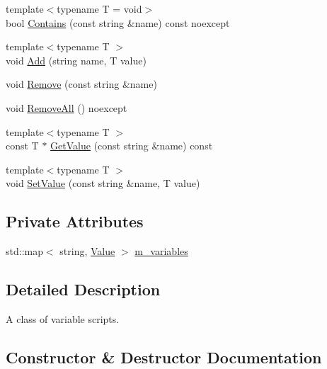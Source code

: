 \begin{DoxyCompactItemize}
\item 
{\footnotesize template$<$typename T  = void$>$ }\\bool \hyperlink{classmage_1_1_variable_script_a86143720f1495e20d461e0a65e2c5c8d}{Contains} (const string \&name) const noexcept
\item 
{\footnotesize template$<$typename T $>$ }\\void \hyperlink{classmage_1_1_variable_script_ad41e19065e7935974585a1b120ef47d4}{Add} (string name, T value)
\item 
void \hyperlink{classmage_1_1_variable_script_aac74a9edbe78e0caa1095ce32835501d}{Remove} (const string \&name)
\item 
void \hyperlink{classmage_1_1_variable_script_add51955d83e85e6d6acd82cfe40bed26}{Remove\+All} () noexcept
\item 
{\footnotesize template$<$typename T $>$ }\\const T $\ast$ \hyperlink{classmage_1_1_variable_script_aaed50c03f7affeeac269fbc15248caf6}{Get\+Value} (const string \&name) const
\item 
{\footnotesize template$<$typename T $>$ }\\void \hyperlink{classmage_1_1_variable_script_a43772c8d83466b32a6f16e5564d43026}{Set\+Value} (const string \&name, T value)
\end{DoxyCompactItemize}
\subsection*{Private Attributes}
\begin{DoxyCompactItemize}
\item 
std\+::map$<$ string, \hyperlink{namespacemage_aa1fe0628487e0706e44efdc62dbdb3a2}{Value} $>$ \hyperlink{classmage_1_1_variable_script_aed925cedf17c486fad876764e53d9e04}{m\+\_\+variables}
\end{DoxyCompactItemize}


\subsection{Detailed Description}
A class of variable scripts. 

\subsection{Constructor \& Destructor Documentation}
\hypertarget{classmage_1_1_variable_script_a87830f09a97aa8f7df3074029c5ab8d5}{}\label{classmage_1_1_variable_script_a87830f09a97aa8f7df3074029c5ab8d5} 
